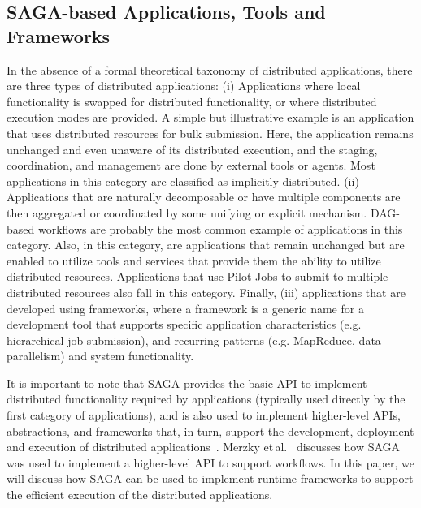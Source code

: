 \subsection{SAGA-based Applications, Tools and Frameworks}
    
	
    In the absence of a formal theoretical taxonomy of distributed
    applications, %
    there are three types of distributed applications: (i) Applications
    where local functionality is swapped for distributed functionality,
    or where distributed execution modes are provided.  A simple but
    illustrative example is an application that uses distributed
    resources for bulk submission. Here, the application remains
    unchanged and even unaware of its distributed execution, and the
    staging, coordination, and management are done by external tools or
    agents. Most applications in this category are classified as
    implicitly distributed.  (ii) Applications that are naturally
    decomposable or have multiple components are then aggregated or
    coordinated by some unifying or explicit mechanism.  DAG-based
    workflows are probably the most common example of applications in
    this category. Also, in this category, are applications that remain
    unchanged but are enabled to utilize tools and services that provide
    them the ability to utilize distributed resources.  Applications
    that use Pilot Jobs to submit to multiple distributed resources also
    fall in this category.  Finally, (iii) applications that are
    developed using frameworks, where a framework is a generic name for
    a development tool that supports specific application
    characteristics (e.g. hierarchical job submission), and recurring
    patterns (e.g. MapReduce, data parallelism) and system
    functionality.


    It is important to note that SAGA provides the basic API to
    implement distributed functionality required by applications
    (typically used directly by the first category of applications), and
    is also used to implement higher-level APIs, abstractions, and
    frameworks that, in turn, support the development, deployment and
    execution of distributed applications~\cite{enkf-gmac09}. Merzky
    et\,al.~\cite{sagamontage09} discusses how SAGA was used to
    implement a higher-level API to support workflows. In this paper, we
    will discuss how SAGA can be used to implement runtime frameworks to
    support the efficient execution of the distributed applications.

